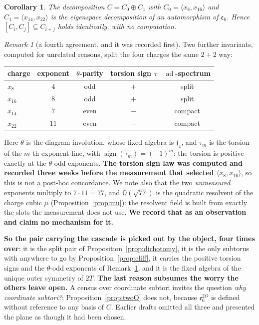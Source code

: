 \documentclass[11pt,reqno]{amsart}
\theoremstyle{plain}
\newtheorem{corollary}[theorem]{Corollary}
\theoremstyle{definition}
\theoremstyle{remark}
\newtheorem{remark}[theorem]{Remark}
\newcommand{\Q}{\mathbb{Q}}
\newcommand{\ee}{\mathfrak{e}}
\newcommand{\ff}{\mathfrak{f}}
\newcommand{\ad}{\operatorname{ad}}
\begin{document}
\begin{corollary}\label{cor:gradfree}
The decomposition $C=C_0\oplus C_1$ with $C_0=\langle x_8,x_{16}\rangle$ and
$C_1=\langle x_{14},x_{22}\rangle$ is the eigenspace decomposition of an automorphism of
$\ee_6$. Hence $[C_i,C_j]\subseteq C_{i+j}$ holds identically, with no computation.
\end{corollary}

\begin{remark}[a fourth agreement, and it was recorded first]\label{rem:concord}
Two further invariants, computed for unrelated reasons, split the four charges the same
$2+2$ way:
\begin{center}\small
\begin{tabular}{@{}lcccc@{}}
\toprule
charge & exponent & $\theta$-parity & torsion sign $\tau$ & $\ad$-spectrum\\
\midrule
$x_8$    & $4$  & odd  & $+$ & split\\
$x_{16}$ & $8$  & odd  & $+$ & split\\
$x_{14}$ & $7$  & even & $-$ & compact\\
$x_{22}$ & $11$ & even & $-$ & compact\\
\bottomrule
\end{tabular}
\end{center}
Here $\theta$ is the diagram involution, whose fixed algebra is $\ff_4$, and $\tau_m$ is
the torsion of the $m$-th exponent line, with $\operatorname{sign}(\tau_m)=(-1)^m$: the
torsion is positive exactly at the $\theta$-odd exponents. \textbf{The torsion sign law
was computed and recorded three weeks before the measurement that selected
$\langle x_8,x_{16}\rangle$}, so this is not a post-hoc concordance. We note also that
the two \emph{unmeasured} exponents multiply to $7\cdot11=77$, and $\Q(\sqrt{77})$ is the
quadratic resolvent of the charge cubic $\mu$ (Proposition~\ref{prop:mu}): the resolvent
field is built from exactly the slots the measurement does not use. \textbf{We record
that as an observation and claim no mechanism for it.}
\end{remark}

\textbf{So the pair carrying the cascade is picked out by the object, four times over}:
it is the split pair of Proposition~\ref{prop:dichotomy}, it is the only subtorus with
anywhere to go by Proposition~\ref{prop:cliff}, it carries the positive torsion signs and
the $\theta$-odd exponents of Remark~\ref{rem:concord}, and it is the fixed algebra of the
unique outer symmetry of $2T$. \textbf{The last reason subsumes the worry the others leave
open.} A census over coordinate subtori invites the question \emph{why coordinate
subtori?}; Proposition~\ref{prop:twoO} does not, because $\ee_6^{2O}$ is defined without
reference to any basis of $C$. Earlier drafts omitted all three and presented the plane as
though it had been chosen.
\end{document}

